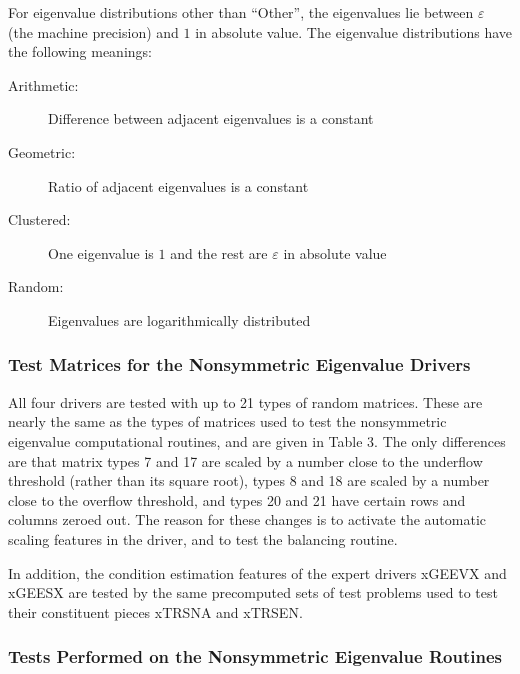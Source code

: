 For eigenvalue distributions other than ``Other'', the eigenvalues
lie between $\varepsilon$ (the machine precision)
and $1$ in absolute value.
The eigenvalue distributions have the following meanings:

\begin{description}
\item[{\rm Arithmetic:}] Difference between adjacent eigenvalues is a constant
\item[{\rm Geometric:}]  Ratio of adjacent eigenvalues is a constant
\item[{\rm Clustered:}]  One eigenvalue is $1$ and the rest are $\varepsilon$
                   in absolute value
\item[{\rm Random:}]     Eigenvalues are logarithmically distributed
\end{description}


\subsubsection{Test Matrices for the Nonsymmetric Eigenvalue Drivers}

\dent
All four drivers are tested with up to 21 types of random matrices.
These are nearly the same as the types of matrices used to test the
nonsymmetric eigenvalue computational routines, and are given in Table
3.
The only differences are that matrix types 7 and 17 are scaled by
a number close to the underflow threshold (rather than its square root),
types 8 and 18 are scaled by a number close to the overflow threshold,
and types 20 and 21 have certain rows and columns zeroed out. The
reason for these changes is to activate the automatic scaling features
in the driver, and to test the balancing routine.

In addition, the condition estimation features of the expert drivers
xGEEVX and xGEESX are tested by the same precomputed sets of test
problems used to test their constituent pieces xTRSNA and xTRSEN.

\subsubsection{Tests Performed on the Nonsymmetric Eigenvalue Routines}

